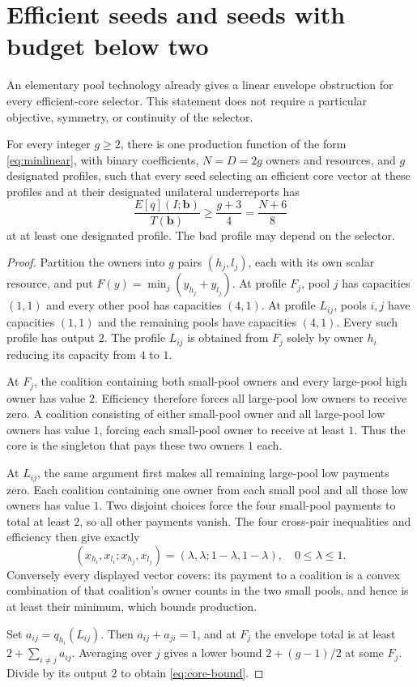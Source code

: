 \section{Efficient seeds and seeds with budget below two}
\label{sec:pool-barriers}

An elementary pool technology already gives a linear envelope obstruction
for every efficient-core selector.  This statement does not require a
particular objective, symmetry, or continuity of the selector.

\begin{theorem}
\label{thm:core-barrier}
For every integer $g\ge2$, there is one production function of the form
\eqref{eq:minlinear}, with binary coefficients, $N=D=2g$ owners and
resources, and $g$ designated profiles, such that every seed selecting an
efficient core vector at these profiles and at their designated unilateral
underreports has
\begin{equation}
 \frac{E[q](I;\mathbf b)}{T(\mathbf b)}
 \ge \frac{g+3}{4}=\frac{N+6}{8}
 \label{eq:core-bound}
\end{equation}
at at least one designated profile.  The bad profile may depend on the
selector.
\end{theorem}
\begin{proof}
Partition the owners into $g$ pairs $(h_j,l_j)$, each with its own scalar
resource, and put
$F(y)=\min_j(y_{h_j}+y_{l_j})$.
At profile $F_j$, pool $j$ has capacities $(1,1)$ and every other pool has
capacities $(4,1)$.  At profile $L_{ij}$, pools $i,j$ have capacities
$(1,1)$ and the remaining pools have capacities $(4,1)$.  Every such
profile has output $2$.  The profile $L_{ij}$ is obtained from $F_j$ solely
by owner $h_i$ reducing its capacity from $4$ to $1$.

At $F_j$, the coalition containing both small-pool owners and every
large-pool high owner has value $2$.  Efficiency therefore forces all
large-pool low owners to receive zero.  A coalition consisting of either
small-pool owner and all large-pool low owners has value $1$, forcing each
small-pool owner to receive at least $1$.  Thus the core is the singleton
that pays these two owners $1$ each.

At $L_{ij}$, the same argument first makes all remaining large-pool low
payments zero.  Each coalition containing one owner from each small pool
and all those low owners has value $1$.  Two disjoint choices force the
four small-pool payments to total at least $2$, so all other payments
vanish.  The four cross-pair inequalities and efficiency then give exactly
\[
 (x_{h_i},x_{l_i};x_{h_j},x_{l_j})
       =(\lambda,\lambda;1-\lambda,1-\lambda),\quad 0\le\lambda\le1.
\]
Conversely every displayed vector covers: its payment to a coalition is
a convex combination of that coalition's owner counts in the two small
pools, and hence is at least their minimum, which bounds production.

Set $a_{ij}=q_{h_i}(L_{ij})$.  Then $a_{ij}+a_{ji}=1$, and at $F_j$
the envelope total is at least $2+\sum_{i\ne j}a_{ij}$.  Averaging over
$j$ gives a lower bound $2+(g-1)/2$ at some $F_j$.  Divide by its output
$2$ to obtain \eqref{eq:core-bound}.
\end{proof}

